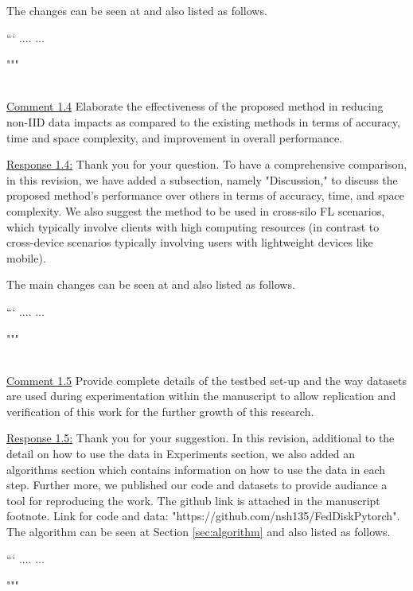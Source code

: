 \colorbox{marygold}{The changes can be seen at  and also listed as follows.}

```
....
...

"""

~\\
\color{blue}
\underline{Comment 1.4}
Elaborate the effectiveness of the proposed method in reducing non-IID data
impacts as compared to the existing methods in terms of accuracy, time and
space complexity, and improvement in overall performance.

\color{black}
\underline{Response 1.4:}
Thank you for your question. To have a comprehensive comparison, in this revision, we have added a subsection, namely "Discussion," to discuss the proposed method's performance over others in terms of accuracy, time, and space complexity. We also suggest the method to be used in cross-silo FL scenarios, which typically involve clients with high computing resources (in contrast to cross-device scenarios typically involving users with lightweight devices like mobile). 

\colorbox{marygold}{The main changes can be seen at  and also listed as follows.}

```
....
...

"""

~\\
\color{blue}
\underline{Comment 1.5}
Provide complete details of the testbed set-up and the way datasets are used
during experimentation within the manuscript to allow replication and
verification of this work for the further growth of this research.

\color{black}
\underline{Response 1.5:}
Thank you for your suggestion. In this revision, additional to the detail on how to use the data in Experiments section, we also added an algorithms section which contains information on how to use the data in each step. Further more, we published our code and datasets to provide audiance a tool for reproducing the work. The github link is attached in the manuscript footnote. Link for code and data:\colorbox{marygold}{ "https://github.com/nsh135/FedDiskPytorch".}\\ 
\setcounter{section}{7}
\setcounter{subsection}{4}
\colorbox{marygold}{The algorithm can be seen at Section \ref{sec:algorithm} and also listed as follows.}

```
....
...

"""


